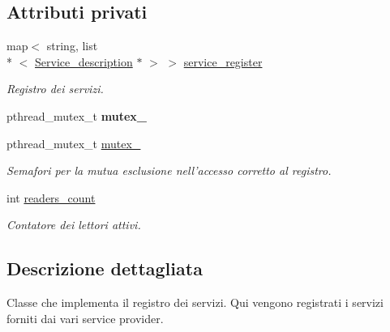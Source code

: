 \subsection*{Attributi privati}
\begin{DoxyCompactItemize}
\item 
\hypertarget{class_service__register_a13985e013b173ff7eecdfdcd12b43f9e}{map$<$ string, list\\*
$<$ \hyperlink{struct_service__description}{Service\-\_\-description} $\ast$ $>$ $>$ \hyperlink{class_service__register_a13985e013b173ff7eecdfdcd12b43f9e}{service\-\_\-register}}\label{class_service__register_a13985e013b173ff7eecdfdcd12b43f9e}

\begin{DoxyCompactList}\small\item\em Registro dei servizi. \end{DoxyCompactList}\item 
\hypertarget{class_service__register_a81270bf181f27c5864ae2e7108f0cf48}{pthread\-\_\-mutex\-\_\-t {\bfseries mutex\-\_}}\label{class_service__register_a81270bf181f27c5864ae2e7108f0cf48}

\item 
\hypertarget{class_service__register_a66404cee532c879f2347d7fda10712ad}{pthread\-\_\-mutex\-\_\-t \hyperlink{class_service__register_a66404cee532c879f2347d7fda10712ad}{mutex\-\_}}\label{class_service__register_a66404cee532c879f2347d7fda10712ad}

\begin{DoxyCompactList}\small\item\em Semafori per la mutua esclusione nell'accesso corretto al registro. \end{DoxyCompactList}\item 
\hypertarget{class_service__register_afc9c10758a1c08b97051c01e4810da1f}{int \hyperlink{class_service__register_afc9c10758a1c08b97051c01e4810da1f}{readers\-\_\-count}}\label{class_service__register_afc9c10758a1c08b97051c01e4810da1f}

\begin{DoxyCompactList}\small\item\em Contatore dei lettori attivi. \end{DoxyCompactList}\end{DoxyCompactItemize}


\subsection{Descrizione dettagliata}
Classe che implementa il registro dei servizi. Qui vengono registrati i servizi forniti dai vari service provider. 

